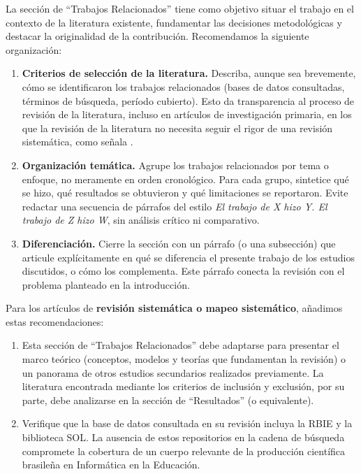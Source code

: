 \documentclass[spanish]{rbie2026}%
\begin{document}
La sección de ``Trabajos Relacionados'' tiene como objetivo situar el trabajo en el contexto de la literatura existente, fundamentar las decisiones metodológicas y destacar la originalidad de la contribución. Recomendamos la siguiente organización:

\begin{enumerate}
  \item \textbf{Criterios de selección de la literatura.} Describa, aunque sea brevemente, cómo se identificaron los trabajos relacionados (bases de datos consultadas, términos de búsqueda, período cubierto). Esto da transparencia al proceso de revisión de la literatura, incluso en artículos de investigación primaria, en los que la revisión de la literatura no necesita seguir el rigor de una revisión sistemática, como señala \cite{Kitchenham2023_SEGRESS}.

  \item \textbf{Organización temática.} Agrupe los trabajos relacionados por tema o enfoque, no meramente en orden cronológico. Para cada grupo, sintetice qué se hizo, qué resultados se obtuvieron y qué limitaciones se reportaron. Evite redactar una secuencia de párrafos del estilo \textit{El trabajo de X hizo Y. El trabajo de Z hizo W}, sin análisis crítico ni comparativo.

  \item \textbf{Diferenciación.} Cierre la sección con un párrafo (o una subsección) que articule explícitamente en qué se diferencia el presente trabajo de los estudios discutidos, o cómo los complementa. Este párrafo conecta la revisión con el problema planteado en la introducción.
\end{enumerate}

Para los artículos de \textbf{revisión sistemática o mapeo sistemático}, añadimos estas recomendaciones:

\begin{enumerate}
    \item Esta sección de ``Trabajos Relacionados'' debe adaptarse para presentar el marco teórico (conceptos, modelos y teorías que fundamentan la revisión) o un panorama de otros estudios secundarios realizados previamente. La literatura encontrada mediante los criterios de inclusión y exclusión, por su parte, debe analizarse en la sección de ``Resultados'' (o equivalente).

    \item Verifique que la base de datos consultada en su revisión incluya la RBIE y la biblioteca SOL. La ausencia de estos repositorios en la cadena de búsqueda compromete la cobertura de un cuerpo relevante de la producción científica brasileña en Informática en la Educación.
\end{enumerate}
\end{document}

